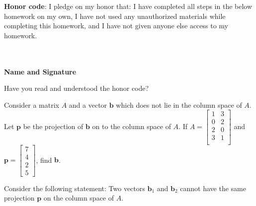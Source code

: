\documentclass[solution,addpoints,12pt]{exam}
\begin{document}
\noindent \textbf{Honor code}: I pledge on my honor that: I have completed all steps in the below homework on my own, I have not used any unauthorized materials while completing this homework, and I have not given anyone else access to my homework.
\\~\\~\\
\begin{flushright}
\textbf{Name and Signature}

\end{flushright}


\begin{questions}

\question[1] Have you read and understood the honor code?
\begin{solution}

\end{solution}



\question[2] 
Consider a matrix $A$ and a vector $\mathbf{b}$ which does not lie in the column space of $A$. Let $\mathbf{p}$ be the projection of $\mathbf{b}$ on to the column space of $A$. If $A = \begin{bmatrix}
1&3\\
0&2\\
2&0\\
3&1\\
\end{bmatrix}$ and $\mathbf{p} = \begin{bmatrix}7\\4\\2\\5\end{bmatrix}$, find $\mathbf{b}$.

\begin{solution}

\end{solution}

\question[2] Consider the following statement: Two vectors $\mathbf{b}_1$ and $\mathbf{b}_2$ cannot have the same projection $\mathbf{p}$ on the column space of $A$.

\end{questions}
\end{document}
